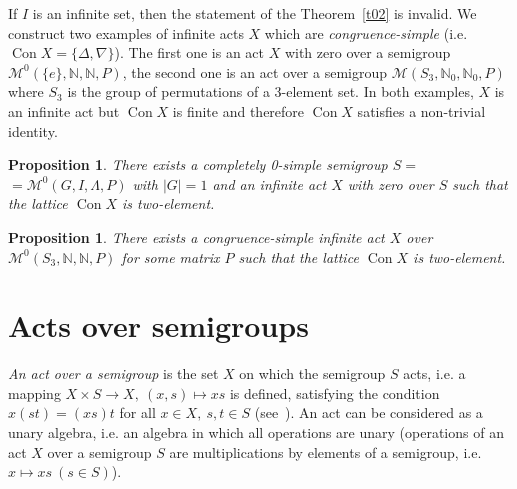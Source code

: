 \documentclass{birkau}
\numberwithin{equation}{section}
\theoremstyle{plain}
\newtheorem{proposition}[theorem]{Proposition}
\theoremstyle{definition}
\DeclareMathOperator{\Con}{Con}
\begin{document}
	If $I$ is an infinite set, then the statement of the Theorem~\ref{t02} is invalid. We construct two examples of infinite acts $X$ which are \textit{congruence-simple} (i.e. $\Con X = \{ \Delta, \nabla \}$). The first one is an act $X$ with zero over a semigroup $\mathcal{M}^0(\{e\},\mathbb{N},\mathbb{N},P)$, the second one is an act over a semigroup $\mathcal{M}(S_3,\mathbb{N}_0,\mathbb{N}_0,P)$ where $S_3$ is the group of permutations of a 3-element set. In both examples, $X$ is an infinite act but $\Con X$ is finite and therefore $\Con X$ satisfies a non-trivial identity.
	
	\begin{proposition} \label{pr01a}
	    There exists a completely 0-simple semigroup $ S = $ \newline $ = \mathcal{M}^0(G,I,\Lambda,P) $ with $|G| = 1$ and an infinite act $X$ with zero over $S$ such that the lattice $\Con X$ is two-element.
	\end{proposition}
	
	\begin{proposition} \label{pr2.1}
	    There exists a congruence-simple infinite act $X$ over \newline $\mathcal{M}^0(S_3,\mathbb{N},\mathbb{N},P) $ for some matrix $P$ such that the lattice $\Con X$ is two-element.
	\end{proposition}

\section{Acts over semigroups}	

	\textit{An act over a semigroup} is the set $X$ on which the semigroup $S$ acts, i.e. a mapping $ X \times S \rightarrow X,\ (x,s) \mapsto xs $ is defined, satisfying the condition $ x(st)=(xs)t $ for all $x\in X,\ s,t\in S$ (see~\cite{kilp}). An act can be considered as a unary algebra, i.e. an algebra in which all operations are unary (operations of an act $X$ over a semigroup $S$ are multiplications by elements of a semigroup, i.e. $ x \mapsto xs \ (s\in S) $).
	
\end{document}
